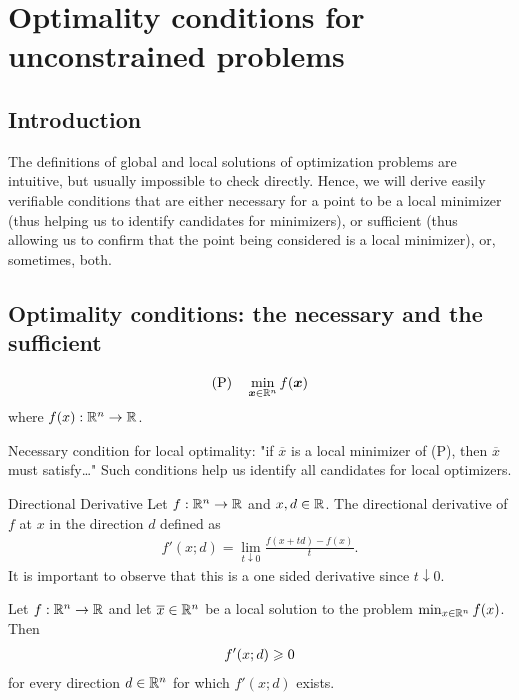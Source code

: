 \chapter{Optimality conditions for unconstrained problems}


\section{Introduction}
The definitions of global and local solutions of optimization problems are intuitive, 
but usually impossible to check directly. 
Hence, we will derive easily verifiable conditions that are either
necessary for a point to be a local minimizer (thus helping us to identify candidates for minimizers),
or sufficient (thus allowing us to confirm that the point being considered is a local minimizer), or,
sometimes, both.

\section{Optimality conditions: the necessary and the sufficient}


\begin{align*}
    (\text{P})\quad \min_{\boldsymbol{x}\in\mathbb{R}^n} f(\boldsymbol{x})
\end{align*}
where $f(x):\mathbb{R}^n\rightarrow\mathbb{R}$.

Necessary condition for local optimality: "if $\overline{x}$ is a local minimizer of (P), 
then $\overline{x}$ must satisfy\dots"
Such conditions help us identify all candidates for local optimizers.

\begin{definition}{Directional Derivative}{}
    Let $f:\mathbb{R}^n\rightarrow \mathbb{R}$ and $x,d\in \mathbb{R}$. The directional derivative of $f$ at $x$ in the direction $d$ defined as 
    \begin{align}
        f'(x;d)=\lim_{t\downarrow 0} \frac{f(x+td)-f(x)}{t}.
    \end{align}
    It is important to observe that this is a one sided derivative since $t\downarrow 0$.
\end{definition}

\begin{lemma}{}{}
    Let $f:\mathbb{R}^n\rightarrow \mathbb{R}$ and let $\overline{x}\in \mathbb{R}^n$ be a local solution to the problem $\min_{x\in \mathbb{R}^n} f(x)$. Then
    \begin{align}
        f'(x;d)\geqslant 0
    \end{align}
    for every direction $d\in \mathbb{R}^n$ for which $f'(x;d)$ exists.
\end{lemma}

